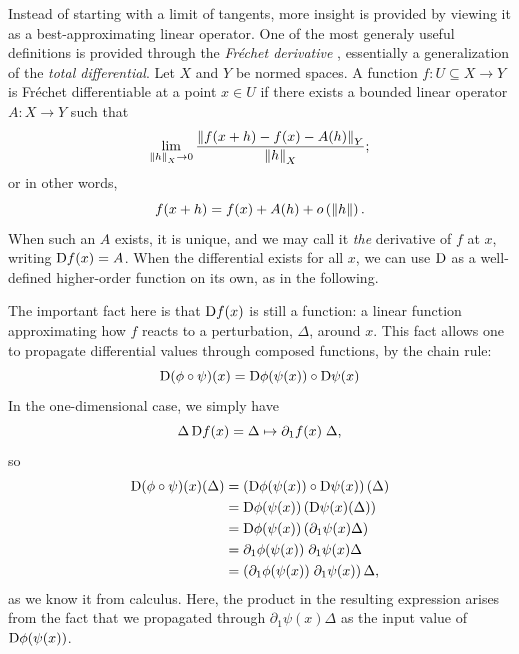Instead of starting with a limit of tangents, more insight is provided by viewing it as a
best-approximating linear operator.  One of the most generaly useful definitions is provided through
the \emph{Fréchet derivative} \parencite{bronstein1995taschenbuch}, essentially a generalization of
the \emph{total differential}.  Let \(X\) and \(Y\) be normed spaces.  A function
\(f: U \subseteq X \to Y\) is Fréchet differentiable at a point \(x \in U\) if there exists a
bounded linear operator \(A: X \to Y\) such that
\begin{equation}
  \label{eq:frechet}
  \lim_{\left\lVert h\right\rVert_X \to 0} \frac{\left\lVert f(x + h) - f(x) - A(h)\right\rVert_Y}{\left\lVert h\right\rVert_X};
\end{equation}
or in other words,
\begin{equation}
  f(x + h) = f(x) + A(h) + o\left(\left\lVert h\right\rVert\right).
\end{equation}
When such an \(A\) exists, it is unique, and we may call it \emph{the} derivative of \(f\) at \(x\),
writing \(\mathop{}\!\mathrm{D} f(x) = A\).  When the differential exists for all \(x\), we can use \(\mathop{}\!\mathrm{D}\) as a
well-defined higher-order function on its own, as in the following.

The important fact here is that \(\mathop{}\!\mathrm{D} f(x)\) is still a function: a linear function approximating how
\(f\) reacts to a perturbation, \(\Delta\), around \(x\).  This fact allows one to propagate differential
values through composed functions, by the chain rule:
\begin{equation}
  \mathop{}\!\mathrm{D}(\phi \circ \psi)(x) = \mathop{}\!\mathrm{D}\phi(\psi(x)) \circ \mathop{}\!\mathrm{D}\psi(x)
\end{equation}
In the one-dimensional case, we simply have
\begin{equation}
  \Delta\mathop{}\!\mathrm{D} f(x) = \Delta \mapsto \partial_1 f(x) \; \Delta,
\end{equation}
so
\begin{equation}
  \begin{aligned}
    \mathop{}\!\mathrm{D}(\phi \circ \psi)(x)(\Delta) &=
    \left( \mathop{}\!\mathrm{D}\phi(\psi(x)) \circ \mathop{}\!\mathrm{D}\psi(x) \right)(\Delta) \\
    &= \mathop{}\!\mathrm{D}\phi(\psi(x))\left( \mathop{}\!\mathrm{D}\psi(x)(\Delta) \right) \\
    &= \mathop{}\!\mathrm{D}\phi(\psi(x))\left( \partial_1 \psi(x) \Delta \right) \\
    &= \partial_1\phi(\psi(x)) \; \partial_1 \psi(x) \Delta \\
    &= \left( \partial_1\phi(\psi(x)) \; \partial_1 \psi(x) \right) \Delta,
  \end{aligned}
\end{equation}
as we know it from calculus.  Here, the product in the resulting expression arises from the fact
that we propagated through \(\partial_1 \psi(x) \Delta\) as the input value of \(\mathop{}\!\mathrm{D}\phi(\psi(x))\).

